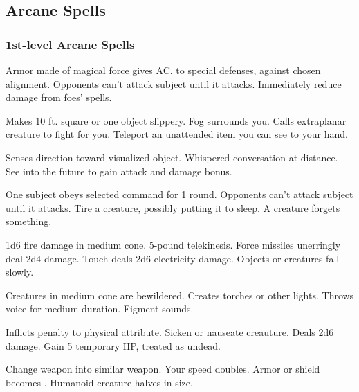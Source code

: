 \subsection{Arcane Spells}\label{Arcane Spells}
\subsubsection{1st-level Arcane Spells}
\begin{swspelllist}
     Armor made of magical force gives  AC.
      to special defenses,  against chosen alignment.
     Opponents can't attack subject until it attacks.
     Immediately reduce damage from foes' spells.

     Makes 10 ft. square or one object slippery.
     Fog surrounds you.
     Calls extraplanar creature to fight for you.
     Teleport an unattended item you can see to your hand.

    \spellhead[Div]{}
     Senses direction toward visualized object.
     Whispered conversation at distance.
     See into the future to gain attack and damage bonus.

     One subject obeys selected command for 1 round.
     Opponents can't attack subject until it attacks.
     Tire a creature, possibly putting it to sleep.
     A creature forgets something.

     1d6 fire damage in medium cone.
     5-pound telekinesis.
     Force missiles unerringly deal 2d4 damage.
     Touch deals 2d6 electricity damage.
     Objects or creatures fall slowly.

     Creatures in medium cone are bewildered.
     Creates torches or other lights.
     Throws voice for medium duration.
     Figment sounds.

     Inflicts  penalty to physical attribute.
     Sicken or nauseate creauture.
     Deals 2d6 damage.
     Gain 5 temporary HP, treated as undead.

     Change weapon into similar weapon.
     Your speed doubles.
     Armor or shield becomes .
     Humanoid creature halves in size.
\end{swspelllist}

